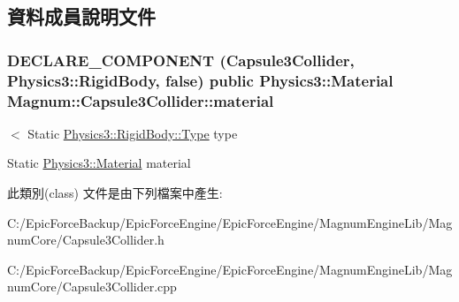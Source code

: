 \subsection{資料成員說明文件}
\subsubsection[{\texorpdfstring{material}{material}}]{\setlength{\rightskip}{0pt plus 5cm}D\+E\+C\+L\+A\+R\+E\+\_\+\+C\+O\+M\+P\+O\+N\+E\+NT ({\bf Capsule3\+Collider}, {\bf Physics3\+::\+Rigid\+Body}, false) public {\bf Physics3\+::\+Material} Magnum\+::\+Capsule3\+Collider\+::material}\hypertarget{class_magnum_1_1_capsule3_collider_ad3730085eea82d77cf999f41439c4c10}{}\label{class_magnum_1_1_capsule3_collider_ad3730085eea82d77cf999f41439c4c10}


$<$ Static \hyperlink{class_magnum_1_1_physics3_1_1_rigid_body_a429aa4fb7256b083334c86cdcd0d6b31}{Physics3\+::\+Rigid\+Body\+::\+Type} type 

Static \hyperlink{class_magnum_1_1_physics3_1_1_material}{Physics3\+::\+Material} material 

此類別(class) 文件是由下列檔案中產生\+:\begin{DoxyCompactItemize}
\item 
C\+:/\+Epic\+Force\+Backup/\+Epic\+Force\+Engine/\+Epic\+Force\+Engine/\+Magnum\+Engine\+Lib/\+Magnum\+Core/Capsule3\+Collider.\+h\item 
C\+:/\+Epic\+Force\+Backup/\+Epic\+Force\+Engine/\+Epic\+Force\+Engine/\+Magnum\+Engine\+Lib/\+Magnum\+Core/Capsule3\+Collider.\+cpp\end{DoxyCompactItemize}
